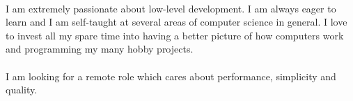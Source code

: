 \paragraph*{}
I am extremely passionate about low-level development. I am always eager to learn and I am self-taught at several areas of computer science in general. I love to invest all my spare time into having a better picture of how computers work and programming my many hobby projects.
\paragraph*{}
I am looking for a remote role which cares about performance, simplicity and quality.